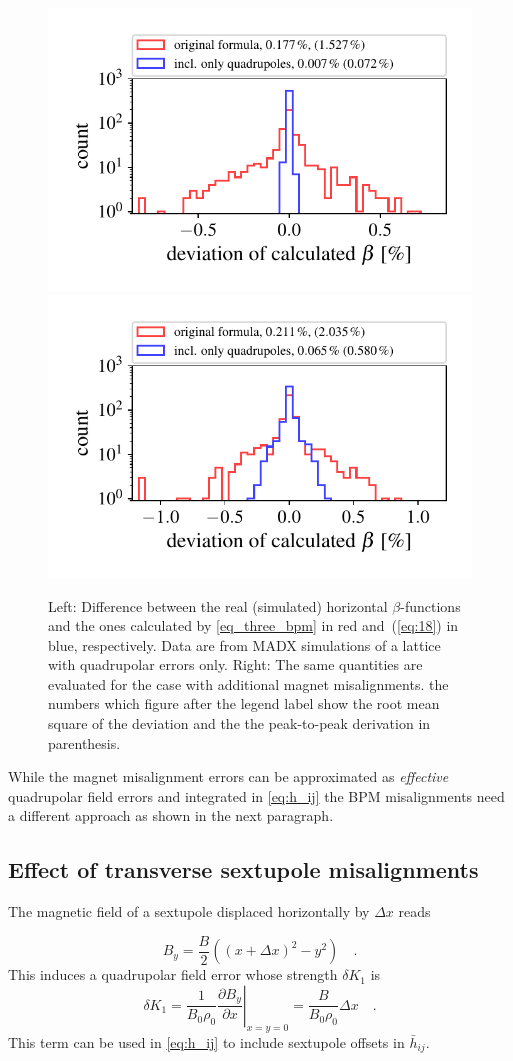 \begin{figure}
	\centering
  \includegraphics[width=.49\linewidth]{hist1518_ONLYQUADS_01}
  \includegraphics[width=.49\linewidth]{hist1518_NAIV_01}
	\caption{
        Left: Difference between the real (simulated) horizontal $\beta$-functions and the ones
        calculated by \eqref{eq_three_bpm} in red and~(\ref{eq:18}) in blue, respectively. Data are from MADX
        simulations of a lattice with quadrupolar errors only.
        Right: The same quantities are evaluated for the case with additional magnet misalignments.
        the numbers which figure after the legend label show the root mean square of the deviation
        and the the peak-to-peak derivation in parenthesis.
    }
	\label{fig:hist1518}
\end{figure}

While the magnet misalignment errors can be approximated as \emph{effective} quadrupolar field errors
and integrated in \eqref{eq:h_ij} the BPM misalignments need a different approach as shown in the
next paragraph.

\subsection{Effect of transverse sextupole misalignments}

The magnetic field of a sextupole displaced horizontally by $ \Delta x $ reads

\begin{equation}
B_y = \frac{B}{2}((x + \Delta x)^2 - y^2)\quad .
\end{equation}
{This induces a quadrupolar field error whose strength $ \delta K_1 $ is}
\begin{equation}
\delta K_1 =  \left.\frac{1}{B_0\rho_0}\frac{\partial B_y}{\partial x}\right|_{x=y=0}
  = \frac{B}{B_0\rho_0}\Delta x \quad .
\end{equation}
This {term} can be used in \eqref{eq:h_ij} to include sextupole offsets in $ \bar{h}_{ij} $.

